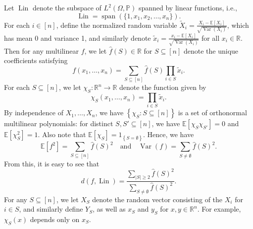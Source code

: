 \documentclass[12pt,letterpaper]{amsart}
\def\E{\mathbb{E}}
\def\P{\mathbb{P}}
\def\R{\mathbb{R}}
\def\Var{\operatorname{Var}}
\def\Lin{\operatorname{Lin}}
\newcommand{\abs}[1]{\left\lvert#1\right\rvert}
\newcommand{\set}[1]{\left\{#1\right\}}
\newcommand{\1}[1]{1_{\left\{#1\right\}}}
\theoremstyle{definition}
\theoremstyle{remark}
\begin{document}
Let $\Lin$ denote the subspace of $L^2(\Omega,\P)$ spanned by linear functions, i.e.,
\[ \Lin=\operatorname{span}(\{1,x_1,x_2,\dots,x_n\}). \]
For each $i\in[n]$, define the normalized random variable $\widetilde X_i = \frac{X_i-\E[X_i]}{\sqrt{\Var(X_i)}}$, which has mean 0 and variance 1, and similarly denote $\widetilde x_i = \frac{x_i-\E[X_i]}{\sqrt{\Var(X_i)}}$ for all $x_i\in\R$.
Then for any multilinear $f$, we let $\widehat f(S)\in\R$ for $S\subseteq[n]$ denote the unique coefficients satisfying
\[ f(x_1,\dots,x_n) = \sum_{S\subseteq[n]}\widehat f(S)\prod_{i\in S}\widetilde x_i. \]
For each $S\subseteq[n]$, we let $\chi_S:\R^n\to\R$ denote the function given by
\[ \chi_S(x_1,\dots,x_n) = \prod_{i\in S}\widetilde x_i. \]
By independence of $X_1,\dots,X_n$, we have $\set{\chi_S:S\subseteq[n]}$ is a set of orthonormal multilinear polynomials: for distinct $S,S'\subseteq[n]$, we have $\E[\chi_S\chi_{S'}]=0$ and $\E[\chi_S^2]=1$.
Also note that $\E[\chi_S]=\1{S=\emptyset}$.
Hence, we have
\[ \E[f^2] = \sum_{S\subseteq[n]}\widehat f(S)^2 \quad\text{and}\quad \Var(f) = \sum_{S\neq\emptyset}\widehat f(S)^2. \]
From this, it is easy to see that
\[ d(f,\Lin) = \frac{\displaystyle\sum_{\abs{S}\geq2}\widehat f(S)^2}{\displaystyle\sum_{S\neq\emptyset}\widehat f(S)^2}. \]
For any $S\subseteq[n]$, we let $X_S$ denote the random vector consisting of the $X_i$ for $i\in S$, and similarly define $Y_S$, as well as $x_S$ and $y_S$ for $x,y\in\R^n$.
For example, $\chi_S(x)$ depends only on $x_S$.
\end{document}
